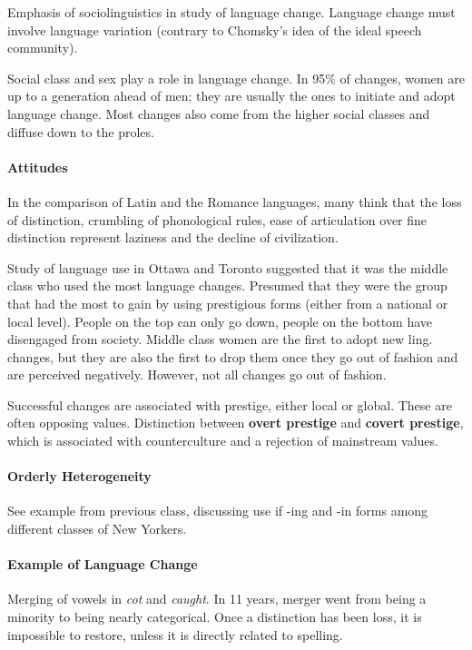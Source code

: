 \documentclass{exam}
\begin{document}
Emphasis of sociolinguistics in study of language change. Language change must involve language variation (contrary to Chomsky's idea of the ideal speech community). 

Social class and sex play a role in language change. In 95\% of changes, women are up to a generation ahead of men; they are usually the ones to initiate and adopt language change. Most changes also come from the higher social classes and diffuse down to the proles. 

\paragraph{Attitudes} In the comparison of Latin and the Romance languages, many think that the loss of distinction, crumbling of phonological rules, ease of articulation over fine distinction represent laziness and the decline of civilization. 

Study of language use in Ottawa and Toronto suggested that it was the middle class who used the most language changes. Presumed that they were the group that had the most to gain by using prestigious forms (either from a national or local level). People on the top can only go down, people on the bottom have disengaged from society. Middle class women are the first to adopt new ling. changes, but they are also the first to drop them once they go out of fashion and are perceived negatively. However, not all changes go out of fashion. 

Successful changes are associated with prestige, either local or global. These are often opposing values. Distinction between \textbf{overt prestige} and \textbf{covert prestige}, which is associated with counterculture and a rejection of mainstream values. 

\paragraph{Orderly Heterogeneity} See example from previous class, discussing use if -ing and -in forms among different classes of New Yorkers. 

\paragraph{Example of Language Change} Merging of vowels in \textit{cot} and \textit{caught}. In 11 years, merger went from being a minority to being nearly categorical. Once a distinction has been loss, it is impossible to restore, unless it is directly related to spelling. 
\end{document}
